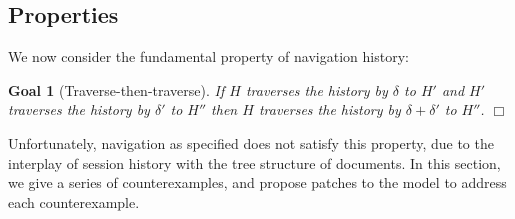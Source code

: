 \documentclass{notes}
\newtheorem{goal}{Goal}
\newcommand{\QED}{\hfill$\Box$}
\begin{document}
\subsection{Properties}
\label{sec:properties}

We now consider the fundamental property of navigation history:

\begin{goal}[Traverse-then-traverse]
\label{goal:homomorphism}
  If $H$ traverses the history by $\delta$ to $H'$
  and $H'$ traverses the history by $\delta'$ to $H''$
  then $H$ traverses the history by $\delta+\delta'$ to $H''$.
  \QED
\end{goal}
Unfortunately, navigation as specified does not satisfy this property,
due to the interplay of session history with the tree structure of documents.
In this section, we give a series of counterexamples, and propose patches to
the model to address each counterexample.
\end{document}
